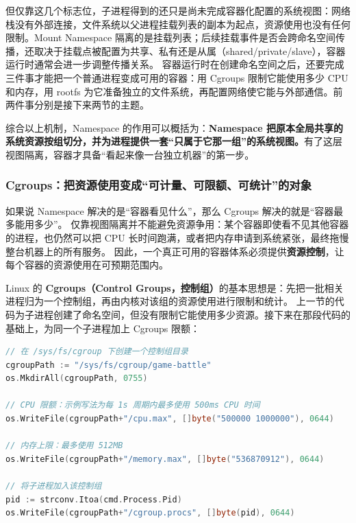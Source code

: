 但仅靠这几个标志位，子进程得到的还只是尚未完成容器化配置的系统视图：网络栈没有外部连接，文件系统以父进程挂载列表的副本为起点，资源使用也没有任何限制。Mount Namespace 隔离的是挂载列表；后续挂载事件是否会跨命名空间传播，还取决于挂载点被配置为共享、私有还是从属（shared/private/slave），容器运行时通常会进一步调整传播关系。
容器运行时在创建命名空间之后，还要完成三件事才能把一个普通进程变成可用的容器：用 Cgroups 限制它能使用多少 CPU 和内存，用 rootfs 为它准备独立的文件系统，再配置网络使它能与外部通信。前两件事分别是接下来两节的主题。

综合以上机制，Namespace 的作用可以概括为：\textbf{Namespace 把原本全局共享的系统资源按组切分，并为进程提供一套“只属于它那一组”的系统视图。}有了这层视图隔离，容器才具备“看起来像一台独立机器”的第一步。

\subsubsection{Cgroups：把资源使用变成“可计量、可限额、可统计”的对象}

如果说 Namespace 解决的是“容器看见什么”，那么 Cgroups 解决的就是“容器最多能用多少”。
仅靠视图隔离并不能避免资源争用：某个容器即使看不见其他容器的进程，也仍然可以把 CPU 长时间跑满，或者把内存申请到系统紧张，最终拖慢整台机器上的所有服务。
因此，一个真正可用的容器体系必须提供\textbf{资源控制}，让每个容器的资源使用在可预期范围内。

Linux 的 \textbf{Cgroups（Control Groups，控制组）}的基本思想是：先把一批相关进程归为一个控制组，再由内核对该组的资源使用进行限制和统计。
上一节的代码为子进程创建了命名空间，但没有限制它能使用多少资源。接下来在那段代码的基础上，为同一个子进程加上 Cgroups 限额：

\begin{tcolorbox}[title=为子进程创建控制组并设置 CPU 和内存限额（伪代码）]
\begin{lstlisting}[style=codeblock, language=go]
// 在 /sys/fs/cgroup 下创建一个控制组目录
cgroupPath := "/sys/fs/cgroup/game-battle"
os.MkdirAll(cgroupPath, 0755)

// CPU 限额：示例写法为每 1s 周期内最多使用 500ms CPU 时间
os.WriteFile(cgroupPath+"/cpu.max", []byte("500000 1000000"), 0644)

// 内存上限：最多使用 512MB
os.WriteFile(cgroupPath+"/memory.max", []byte("536870912"), 0644)

// 将子进程加入该控制组
pid := strconv.Itoa(cmd.Process.Pid)
os.WriteFile(cgroupPath+"/cgroup.procs", []byte(pid), 0644)
\end{lstlisting}
\end{tcolorbox}

